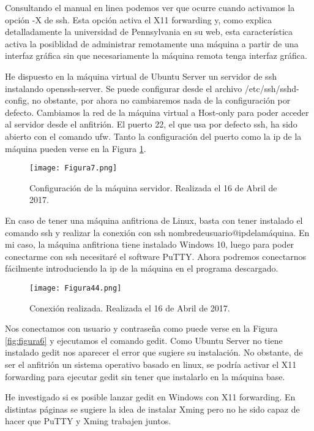 Consultando el manual en linea\cite{manssh} podemos ver que ocurre cuando activamos la opción -X de ssh.
Esta opción activa el X11 forwarding y, como explica detalladamente la universidad de Pennsylvania en su web\cite{penn}, esta característica activa la posiblidad de 
administrar remotamente una máquina a partir de una interfaz gráfica sin que necesariamente la máquina remota tenga interfaz gráfica.

\vspace{6mm}

He dispuesto en la máquina virtual de Ubuntu Server un servidor de ssh instalando openssh-server. Se puede configurar desde el archivo /etc/ssh/sshd-config, no obstante,
por ahora no cambiaremos nada de la configuración por defecto. Cambiamos la red de la máquina virtual a Host-only para poder acceder al servidor desde el anfitrión.
El puerto 22, el que usa por defecto ssh, ha sido abierto con el comando ufw. Tanto la configuración del puerto como la ip de la máquina pueden verse en 
la Figura \ref{fig:figura7}. 

\begin{figure}[H] 
\centering
\texttt{[image: Figura7.png]}  
\caption{Configuración de la máquina servidor. Realizada el 16 de Abril de 2017.} \label{fig:figura7}
\end{figure}

En caso de tener una máquina anfitriona de Linux, basta con tener instalado el comando ssh y realizar la conexión con ssh nombredeusuario@ipdelamáquina.
En mi caso, la máquina anfitriona tiene instalado Windows 10, luego para poder conectarme con ssh necesitaré el software PuTTY\cite{putty}. Ahora podremos
conectarnos fácilmente introduciendo la ip de la máquina en el programa descargado. 

\begin{figure}[H] 
\centering
\texttt{[image: Figura44.png]}  
\caption{Conexión realizada. Realizada el 16 de Abril de 2017.} \label{fig:figura44}
\end{figure}

Nos conectamos con usuario y contraseña como puede verse en la Figura \ref{fig:figura6}
y ejecutamos el comando gedit. Como Ubuntu Server no tiene instalado gedit nos aparecer el error que sugiere su instalación. No obstante, de ser el anfitrión
un sistema operativo basado en linux, se podría activar el X11 forwarding para ejecutar gedit sin tener que instalarlo en la máquina base.

He investigado si es posible lanzar gedit en Windows con X11 forwarding. En distintas páginas se sugiere la idea de instalar Xming pero no he sido capaz de 
hacer que PuTTY y Xming trabajen juntos.


